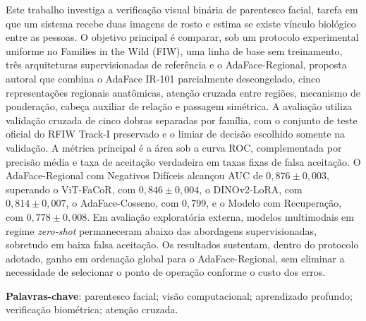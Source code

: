 \begin{resumo}
Este trabalho investiga a verificação visual binária de parentesco facial, tarefa em que um sistema recebe duas imagens de rosto e estima se existe vínculo biológico entre as pessoas. O objetivo principal é comparar, sob um protocolo experimental uniforme no Families in the Wild (FIW), uma linha de base sem treinamento, três arquiteturas supervisionadas de referência e o AdaFace-Regional, proposta autoral que combina o AdaFace IR-101 parcialmente descongelado, cinco representações regionais anatômicas, atenção cruzada entre regiões, mecanismo de ponderação, cabeça auxiliar de relação e passagem simétrica. A avaliação utiliza validação cruzada de cinco dobras separadas por família, com o conjunto de teste oficial do RFIW Track-I preservado e o limiar de decisão escolhido somente na validação. A métrica principal é a área sob a curva ROC, complementada por precisão média e taxa de aceitação verdadeira em taxas fixas de falsa aceitação. O AdaFace-Regional com Negativos Difíceis alcançou AUC de $0{,}876 \pm 0{,}003$, superando o ViT-FaCoR, com $0{,}846 \pm 0{,}004$, o DINOv2-LoRA, com $0{,}814 \pm 0{,}007$, o AdaFace-Cosseno, com $0{,}799$, e o Modelo com Recuperação, com $0{,}778 \pm 0{,}008$. Em avaliação exploratória externa, modelos multimodais em regime \textit{zero-shot} permaneceram abaixo das abordagens supervisionadas, sobretudo em baixa falsa aceitação. Os resultados sustentam, dentro do protocolo adotado, ganho em ordenação global para o AdaFace-Regional, sem eliminar a necessidade de selecionar o ponto de operação conforme o custo dos erros.

\vspace{\onelineskip}

\noindent
\textbf{Palavras-chave}: parentesco facial; visão computacional; aprendizado profundo; verificação biométrica; atenção cruzada.
\end{resumo}

